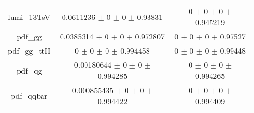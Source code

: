 \begin{table}
\begin{tabular}{ccc}
lumi\_13TeV & \num{0.0611236} $\pm$ \num{0} $\pm$ \num{0} $\pm$ \num{0.93831} & \num{0} $\pm$ \num{0} $\pm$ \num{0} $\pm$ \num{0.945219}\\
pdf\_gg & \num{0.0385314} $\pm$ \num{0} $\pm$ \num{0} $\pm$ \num{0.972807} & \num{0} $\pm$ \num{0} $\pm$ \num{0} $\pm$ \num{0.97527}\\
pdf\_gg\_ttH & \num{0} $\pm$ \num{0} $\pm$ \num{0} $\pm$ \num{0.994458} & \num{0} $\pm$ \num{0} $\pm$ \num{0} $\pm$ \num{0.99448}\\
pdf\_qg & \num{0.00180644} $\pm$ \num{0} $\pm$ \num{0} $\pm$ \num{0.994285} & \num{0} $\pm$ \num{0} $\pm$ \num{0} $\pm$ \num{0.994265}\\
pdf\_qqbar & \num{0.000855435} $\pm$ \num{0} $\pm$ \num{0} $\pm$ \num{0.994422} & \num{0} $\pm$ \num{0} $\pm$ \num{0} $\pm$ \num{0.994409}\\
\bottomrule
\end{tabular}
\end{table}